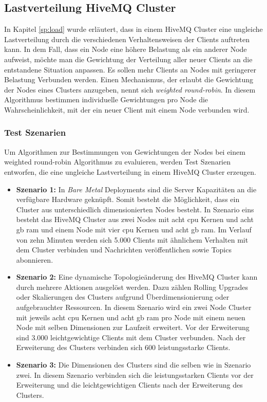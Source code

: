 \subsection{Lastverteilung HiveMQ Cluster} \label{ss:load-distribution}
In Kapitel \ref{sp:load} wurde erläutert, dass in einem HiveMQ Cluster eine ungleiche Lastverteilung durch die verschiedenen Verhaltensweisen der Clients auftreten kann.
In dem Fall, dass ein Node eine höhere Belastung als ein anderer Node aufweist, möchte man die Gewichtung der Verteilung aller neuer Clients an die entstandene Situation anpassen. Es sollen mehr Clients an Nodes mit geringerer Belastung Verbunden werden.
Einen Mechanismus, der erlaubt die Gewichtung der Nodes eines Clusters anzugeben, nennt sich \textit{weighted round-robin}. In diesem Algorithmus bestimmen individuelle Gewichtungen pro Node die Wahrscheinlichkeit, mit der ein neuer Client mit einem Node verbunden wird.

\subsubsection{Test Szenarien} \label{ss:test}
Um Algorithmen zur Bestimmungen von Gewichtungen der Nodes bei einem weighted round-robin Algorithmus zu evaluieren, werden Test Szenarien entworfen, die eine ungleiche Lastverteilung in einem HiveMQ Cluster erzeugen.

\begin{itemize}
  \item \textbf{Szenario 1:} In \textit{Bare Metal} Deployments sind die Server Kapazitäten an die verfügbare Hardware geknüpft. Somit besteht die Möglichkeit, dass ein Cluster aus unterschiedlich dimensionierten Nodes besteht. In Szenario eins besteht das HiveMQ Cluster aus zwei Nodes mit acht \ac{cpu} Kernen und acht \ac{gb} \ac{ram} und einem Node mit vier \ac{cpu} Kernen und acht \ac{gb} \ac{ram}. Im Verlauf von zehn Minuten werden sich 5.000 Clients mit ähnlichem Verhalten mit dem Cluster verbinden und Nachrichten veröffentlichen sowie Topics abonnieren.
  \item \textbf{Szenario 2:} Eine dynamische Topologieänderung des HiveMQ Cluster kann durch mehrere Aktionen ausgelöst werden. Dazu zählen Rolling Upgrades oder Skalierungen des Clusters aufgrund Überdimensionierung oder aufgebrauchter Ressourcen. In diesem Szenario wird ein zwei Node Cluster mit jeweils acht \ac{cpu} Kernen und acht \ac{gb} \ac{ram} pro Node mit einem neuen Node mit selben Dimensionen zur Laufzeit erweitert. Vor der Erweiterung sind 3.000 leichtgewichtige Clients mit dem Cluster verbunden. Nach der Erweiterung des Clusters verbinden sich 600 leistungsstarke Clients.
  \item \textbf{Szenario 3:} Die Dimensionen des Clusters sind die selben wie in Szenario zwei. In diesem Szenario verbinden sich die leistungsstarken Clients vor der Erweiterung und die leichtgewichtigen Clients nach der Erweiterung des Clusters.
\end{itemize}

